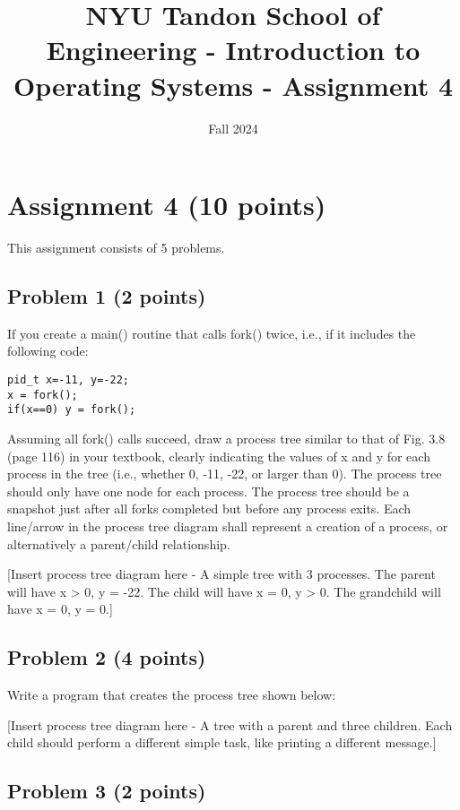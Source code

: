 \documentclass{article}
\title{NYU Tandon School of Engineering - Introduction to Operating Systems - Assignment 4}
\author{}
\date{Fall 2024}
\begin{document}
\maketitle

\section*{Assignment 4 (10 points)}

This assignment consists of 5 problems.

\subsection*{Problem 1 (2 points)}

If you create a main() routine that calls fork() twice, i.e., if it includes the following code:

\begin{verbatim}
pid_t x=-11, y=-22;
x = fork();
if(x==0) y = fork();
\end{verbatim}

Assuming all fork() calls succeed, draw a process tree similar to that of Fig. 3.8 (page 116) in your textbook, clearly indicating the values of x and y for each process in the tree (i.e., whether 0, -11, -22, or larger than 0). The process tree should only have one node for each process. The process tree should be a snapshot just after all forks completed but before any process exits. Each line/arrow in the process tree diagram shall represent a creation of a process, or alternatively a parent/child relationship.

[Insert process tree diagram here -  A simple tree with 3 processes.  The parent will have x > 0, y = -22. The child will have x = 0, y > 0. The grandchild will have x = 0, y = 0.]


\subsection*{Problem 2 (4 points)}

Write a program that creates the process tree shown below:

[Insert process tree diagram here - A tree with a parent and three children.  Each child should perform a different simple task, like printing a different message.]


\subsection*{Problem 3 (2 points)}
\end{document}
